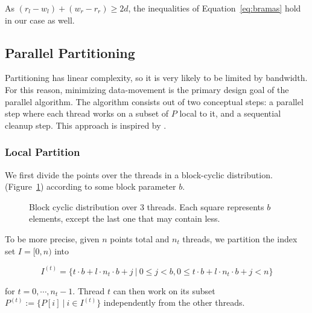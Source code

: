 As $(r_l - w_l) + (w_r - r_r) \geq 2d$, the inequalities of 
Equation~\ref{eq:bramas} hold in our case as well.

\subsection{Parallel Partitioning}

Partitioning has linear complexity, so it is very likely to be limited by
bandwidth. For this reason, minimizing data-movement is the primary design goal
of the parallel algorithm. The algorithm consists out of two conceptual steps:
a parallel step where each thread works on a subset of $P$ local to it, and 
a sequential cleanup step. This approach is inspired by \cite{francis92}.

\subsubsection{Local Partition}

We first divide the points over the threads in a block-cyclic distribution.
(Figure~\ref{fig:blockcycl}) according to some block parameter $b$.

\begin{figure}[ht]
    \caption{Block cyclic distribution over $3$ threads. Each square represents
             $b$ elements, except the last one that may contain less.}
    \label{fig:blockcycl}
\end{figure}

To be more precise, given $n$ points total and $n_t$ threads, we partition
the index set $I = [0, n)$ into

$$I^{(t)} = \{t \cdot b + l \cdot n_t \cdot b + j \ | \ 0 \leq j < b,
                0 \leq t \cdot b + l \cdot n_t \cdot b + j < n\}$$

for $t = 0, \cdots, n_t - 1$. Thread $t$ can then work on its subset
$P^{(t)} := \{P[i] \ | \ i \in I^{(t)}\}$ independently from the other threads.

